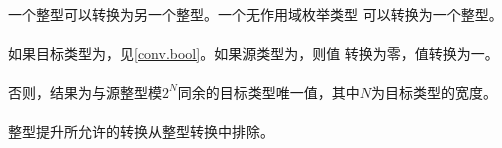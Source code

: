 \paragraph{} %
一个整型\prvalue{}可以转换为另一个整型\prvalue{}。一个无作用域枚举类型\prvalue{}
可以转换为一个整型\prvalue{}。

\paragraph{} %
如果目标类型为，见\ref{conv.bool}。如果源类型为，则值
转换为零，值转换为一。

\paragraph{} %
否则，结果为与源整型模$2^N$同余的目标类型唯一值，其中$N$为目标类型的宽度。

\paragraph{} %
整型提升所允许的转换从整型转换中排除。
